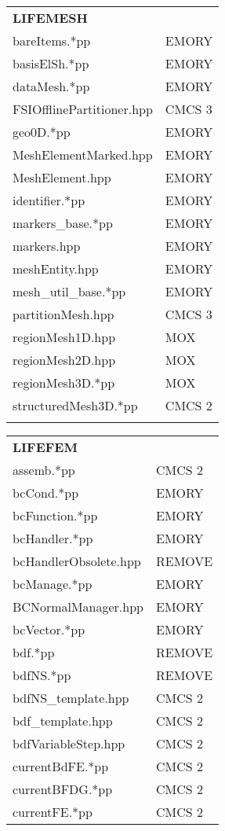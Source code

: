 \documentclass[10p]{article}
\theoremstyle{definition}
\begin{document}
\begin{landscape}
\begin{table}[!h]
\begin{multicols}{4}
\begin{xtabular}{
p{0.18\textwidth}<{}|
p{0.1\textwidth}<{}
}
\textbf{LIFEMESH} \\
bareItems.*pp & EMORY\\
basisElSh.*pp & EMORY\\
dataMesh.*pp & EMORY\\
FSIOfflinePartitioner.hpp & CMCS 3\\
geo0D.*pp & EMORY\\
MeshElementMarked.hpp & EMORY\\
MeshElement.hpp & EMORY\\
identifier.*pp & EMORY\\
markers\_base.*pp & EMORY\\
markers.hpp & EMORY\\
meshEntity.hpp & EMORY\\
mesh\_util\_base.*pp & EMORY\\
partitionMesh.hpp & CMCS 3\\
regionMesh1D.hpp & MOX \\
regionMesh2D.hpp & MOX\\
regionMesh3D.*pp & MOX\\
structuredMesh3D.*pp & CMCS 2\\
& \\
\end{xtabular}
\begin{xtabular}{
p{0.18\textwidth}<{}|
p{0.1\textwidth}<{}
}
\textbf{LIFEFEM} \\
assemb.*pp & CMCS 2\\
bcCond.*pp & EMORY\\
bcFunction.*pp & EMORY\\
bcHandler.*pp & EMORY\\
bcHandlerObsolete.hpp & REMOVE\\
bcManage.*pp & EMORY\\
BCNormalManager.hpp & EMORY\\
bcVector.*pp & EMORY\\
bdf.*pp & REMOVE\\
bdfNS.*pp & REMOVE\\
bdfNS\_template.hpp & CMCS 2\\
bdf\_template.hpp & CMCS 2\\
bdfVariableStep.hpp & CMCS 2\\
currentBdFE.*pp & CMCS 2\\
currentBFDG.*pp & CMCS 2\\
currentFE.*pp & CMCS 2\\

\end{xtabular}
\end{multicols}
\end{table}
\end{landscape}
\end{document}
